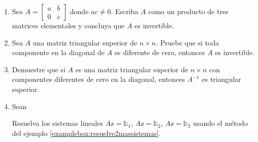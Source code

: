 \begin{enumerate}[start=190]
    \item Sea $A = \begin{bmatrix}
        a & b \\
        0 & c
    \end{bmatrix}$ donde $ac \neq 0$. Escriba $A$ como un producto de tres matrices elementales y concluya que $A$ es invertible.
    \item Sea $A$ una matriz triangular superior de $n \times n$. Pruebe que si toda componente en la diagonal de $A$ es diferente de cero, entonces $A$ es invertible.
    \item Demuestre que si $A$ es una matriz triangular superior de $n \times n$ con componentes diferentes de cero en la diagonal, entonces $A^{-1}$ es triangular superior.
    \item Sean
    \begin{matrizn}
    \end{matrizn}
    Resuelva los sistemas lineales $A\mathbb{x} = \mathbb{b}_1$, $A\mathbb{x} = \mathbb{b}_2$, $A\mathbb{x} = \mathbb{b}_3$ usando el método del ejemplo \ref{examplebox:resuelve2massistemas}.
\end{enumerate}